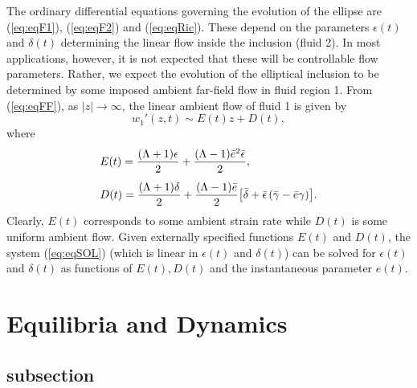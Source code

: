 \documentclass[fleqn]{jleo}
\begin{document}
The ordinary differential equations 
governing the evolution of the ellipse are (\ref{eq:eqF1}),
(\ref{eq:eqF2}) and (\ref{eq:eqRic}).
These depend on the parameters $\epsilon(t)$ and $\delta(t)$
determining the linear flow inside the inclusion (fluid 2).
In most applications, however, it is not expected
that these will be controllable flow parameters.
Rather, we expect the evolution of the elliptical inclusion to be determined
by some imposed ambient far-field flow  in fluid region 1.  From (\ref{eq:eqFF}),
as $|z| \to \infty$, the linear ambient flow of fluid 1 is given by
\begin{equation}
w_1'(z,t) \sim E(t) z + D(t),
\end{equation}
where 
\begin{eqnarray}
\begin{array}{l}
\displaystyle E(t) = {(\Lambda + 1) \epsilon \over 2} + 
{(\Lambda - 1) \bar e^2 \bar \epsilon \over 2}, \\[12pt]
\displaystyle D(t) = {(\Lambda +1) \delta \over 2}+
{(\Lambda -1) \bar e \over 2} {\left[
\bar \delta + {\bar \epsilon}
\left ( \bar \gamma - {\bar e \gamma} \right ) \right]}.
\end{array}
\label{eq:eqSOL}
\end{eqnarray}
Clearly, $E(t)$ corresponds to some ambient strain rate
while $D(t)$ is some uniform ambient flow.
Given externally specified functions $E(t)$ and $D(t)$, the system (\ref{eq:eqSOL})
(which is linear in $\epsilon(t)$ and $\delta(t)$)  can be solved for $\epsilon(t)$
and $\delta(t)$ as functions of $E(t), D(t)$ and the instantaneous parameter $e(t)$.

\section{Equilibria and Dynamics}
\subsection{subsection}
\end{document}
